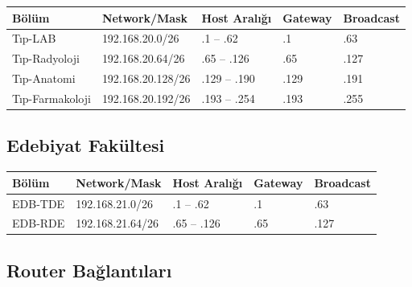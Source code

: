 \documentclass[12pt,a4paper]{article}
\begin{document}
\begin{longtable}{lllll}
\toprule
\textbf{Bölüm} & \textbf{Network/Mask} & \textbf{Host Aralığı} & \textbf{Gateway} & \textbf{Broadcast} \\
\midrule
\endhead
Tıp-LAB & 192.168.20.0/26 & .1 -- .62 & .1 & .63 \\
Tıp-Radyoloji & 192.168.20.64/26 & .65 -- .126 & .65 & .127 \\
Tıp-Anatomi & 192.168.20.128/26 & .129 -- .190 & .129 & .191 \\
Tıp-Farmakoloji & 192.168.20.192/26 & .193 -- .254 & .193 & .255 \\
\bottomrule
\end{longtable}

\subsection{Edebiyat Fakültesi}

\begin{longtable}{lllll}
\toprule
\textbf{Bölüm} & \textbf{Network/Mask} & \textbf{Host Aralığı} & \textbf{Gateway} & \textbf{Broadcast} \\
\midrule
\endhead
EDB-TDE & 192.168.21.0/26 & .1 -- .62 & .1 & .63 \\
EDB-RDE & 192.168.21.64/26 & .65 -- .126 & .65 & .127 \\
\bottomrule
\end{longtable}

\subsection{Router Bağlantıları}
\end{document}
